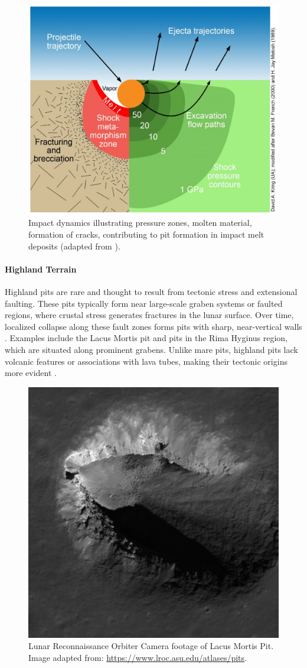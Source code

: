 \begin{figure}[H]
    \centering
    \includegraphics[width=0.42\linewidth]{Impact-Shock-Pressures-and-Their-Effects-1024x857.jpg}
    \caption{Impact dynamics illustrating pressure zones, molten material, formation of cracks, contributing to pit formation in impact melt deposits (adapted from     \cite{clrn-impact-melt}).}
    \label{fig:impact-melt}
\end{figure}

\paragraph{Highland Terrain} Highland pits are rare and thought to result from tectonic stress and extensional faulting. These pits typically form near large-scale graben systems or faulted regions, where crustal stress generates fractures in the lunar surface. Over time, localized collapse along these fault zones forms pits with sharp, near-vertical walls \cite{new-wagner}. Examples include the Lacus Mortis pit and pits in the Rima Hyginus region, which are situated along prominent grabens. Unlike mare pits, highland pits lack volcanic features or associations with lava tubes, making their tectonic origins more evident \cite{lunar-pit-distribution}.

\begin{figure}[H]
    \centering
    \includegraphics[width=0.33\linewidth]{lunar-pit-highland.png}
    \caption{Lunar Reconnaissance Orbiter Camera footage of Lacus Mortis Pit. Image adapted from: \url{https://www.lroc.asu.edu/atlases/pits}.}
    \label{fig:highland-lunar-pit}
\end{figure}

